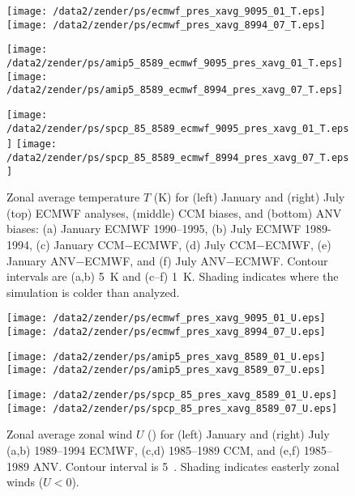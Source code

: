 \documentclass[twocolumn,final]{article}
\begin{document}
\begin{figure*}
\begin{center}
\texttt{[image: /data2/zender/ps/ecmwf\_pres\_xavg\_9095\_01\_T.eps]}%
\texttt{[image: /data2/zender/ps/ecmwf\_pres\_xavg\_8994\_07\_T.eps]}%

\texttt{[image: /data2/zender/ps/amip5\_8589\_ecmwf\_9095\_pres\_xavg\_01\_T.eps]}%
\texttt{[image: /data2/zender/ps/amip5\_8589\_ecmwf\_8994\_pres\_xavg\_07\_T.eps]}%

\texttt{[image: /data2/zender/ps/spcp\_85\_8589\_ecmwf\_9095\_pres\_xavg\_01\_T.eps]}%
\texttt{[image: /data2/zender/ps/spcp\_85\_8589\_ecmwf\_8994\_pres\_xavg\_07\_T.eps]}%
\end{center}
\caption[Zonal average temperature $T$ for January and
July ECMWF analyses, CCM biases, and ANV biases]{
Zonal average temperature $T$ (\degreee K) for (left) January
and (right) July (top) ECMWF analyses, (middle) CCM biases, and
(bottom) ANV biases: (a) January ECMWF 1990--1995, (b) July ECMWF
1989-1994, 
(c) January CCM$-$ECMWF, (d) July CCM$-$ECMWF, (e) January
ANV$-$ECMWF, and (f) July ANV$-$ECMWF.
Contour intervals are (a,b) 5~\degreee K and (c--f) 1~\degreee K. 
Shading indicates where the simulation is colder than analyzed.
\label{fig:pres_xavg_8589_T}}   
\end{figure*}
\clearpage

\begin{figure*}
\begin{center}
\texttt{[image: /data2/zender/ps/ecmwf\_pres\_xavg\_9095\_01\_U.eps]}%
\texttt{[image: /data2/zender/ps/ecmwf\_pres\_xavg\_8994\_07\_U.eps]}%

\texttt{[image: /data2/zender/ps/amip5\_pres\_xavg\_8589\_01\_U.eps]}%
\texttt{[image: /data2/zender/ps/amip5\_pres\_xavg\_8589\_07\_U.eps]}%

\texttt{[image: /data2/zender/ps/spcp\_85\_pres\_xavg\_8589\_01\_U.eps]}%
\texttt{[image: /data2/zender/ps/spcp\_85\_pres\_xavg\_8589\_07\_U.eps]}%
\end{center}
\caption[Zonal average zonal wind $U$ for January and July ECMWF, CCM,
and ANV]{ 
Zonal average zonal wind $U$ (\mxs) for (left) January and
(right) July (a,b) 1989--1994 ECMWF, (c,d) 1985--1989 CCM, and (e,f)
1985--1989 ANV.  
Contour interval is 5~\mxs.
Shading indicates easterly zonal winds ($U < 0$).
\label{fig:pres_xavg_8589_U}}
\end{figure*}
\clearpage
\end{document}
